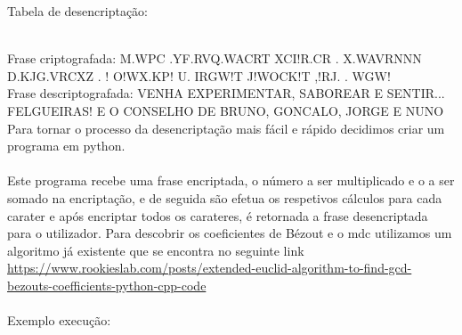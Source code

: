 \documentclass[12pt]{article}
\begin{document}
    \noindent Tabela de desencriptação:
    \begin{table}[hbt!]
    \end{table}\\
    \noindent Frase criptografada: M.WPC .YF.RVQ.WACRT XCI!R.CR . X.WAVRNNN D.KJG.VRCXZ . ! O!WX.KP! U. IRGW!T J!WOCK!T ,!RJ. . WGW!\\
    
    \noindent Frase descriptografada: VENHA EXPERIMENTAR, SABOREAR E SENTIR... FELGUEIRAS! E O CONSELHO DE BRUNO, GONCALO, JORGE E NUNO\\
   
    \noindent Para tornar o processo da desencriptação mais fácil e rápido decidimos criar um programa em python.\\\\
    \noindent Este programa recebe uma frase encriptada, o número a ser multiplicado e o a ser somado na encriptação, e de seguida são efetua os respetivos cálculos para cada carater e após encriptar todos os carateres, é retornada a frase desencriptada para o utilizador.
    Para descobrir os coeficientes de Bézout e o mdc utilizamos um algoritmo já existente que se encontra no seguinte link \url{https://www.rookieslab.com/posts/extended-euclid-algorithm-to-find-gcd-bezouts-coefficients-python-cpp-code}\\\\
    Exemplo execução:
    \begin{center}
    \end{center}
     \newpage
    
\end{document}
